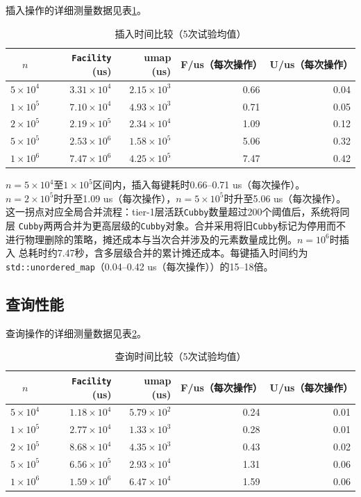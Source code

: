 \documentclass[
    type = bachelor,
    fontset = win,
    decl-page = true,
  ]{njuthesis}
\begin{document}
插入操作的详细测量数据见表\ref{tab:insert}。

\begin{table}[H]
\centering
\begin{tabular}{c|r|r|r|r}
\toprule
$n$ & \texttt{Facility} (us) & umap (us) & F/us（每次操作） & U/us（每次操作） \\
\midrule
$5\times10^4$ & $3.31\times 10^4$ & $2.15\times 10^3$ & 0.66 & 0.04 \\
$1\times10^5$ & $7.10\times 10^4$ & $4.93\times 10^3$ & 0.71 & 0.05 \\
$2\times10^5$ & $2.19\times 10^5$ & $2.34\times 10^4$ & 1.09 & 0.12 \\
$5\times10^5$ & $2.53\times 10^6$ & $1.58\times 10^5$ & 5.06 & 0.32 \\
$1\times10^6$ & $7.47\times 10^6$ & $4.25\times 10^5$ & 7.47 & 0.42 \\
\bottomrule
\end{tabular}
\caption{插入时间比较（5次试验均值）}
\label{tab:insert}
\end{table}

$n=5\times10^4$至$1\times10^5$区间内，插入每键耗时0.66--0.71 us（每次操作）。
$n=2\times10^5$时升至1.09 us（每次操作），$n=5\times10^5$时升至5.06 us（每次操作）。
这一拐点对应全局合并流程：tier-1层活跃\texttt{Cubby}数量超过200个阈值后，系统将同层
\texttt{Cubby}两两合并为更高层级的\texttt{Cubby}对象。合并采用将旧\texttt{Cubby}标记为停用而不进行物理删除的策略，摊还成本与当次合并涉及的元素数量成比例。$n=10^6$时插入
总耗时约7.47秒，含多层级合并的累计摊还成本。每键插入时间约为
\texttt{std::unordered\_map}（0.04--0.42 us（每次操作））的15--18倍。

\subsection{查询性能}

查询操作的详细测量数据见表\ref{tab:query}。

\begin{table}[H]
\centering
\begin{tabular}{c|r|r|r|r}
\toprule
$n$ & \texttt{Facility} (us) & umap (us) & F/us（每次操作） & U/us（每次操作） \\
\midrule
$5\times10^4$ & $1.18\times 10^4$ & $5.79\times 10^2$ & 0.24 & 0.01 \\
$1\times10^5$ & $2.77\times 10^4$ & $1.33\times 10^3$ & 0.28 & 0.01 \\
$2\times10^5$ & $8.68\times 10^4$ & $4.35\times 10^3$ & 0.43 & 0.02 \\
$5\times10^5$ & $6.56\times 10^5$ & $2.93\times 10^4$ & 1.31 & 0.06 \\
$1\times10^6$ & $1.59\times 10^6$ & $6.47\times 10^4$ & 1.59 & 0.06 \\
\bottomrule
\end{tabular}
\caption{查询时间比较（5次试验均值）}
\label{tab:query}
\end{table}
\end{document}
